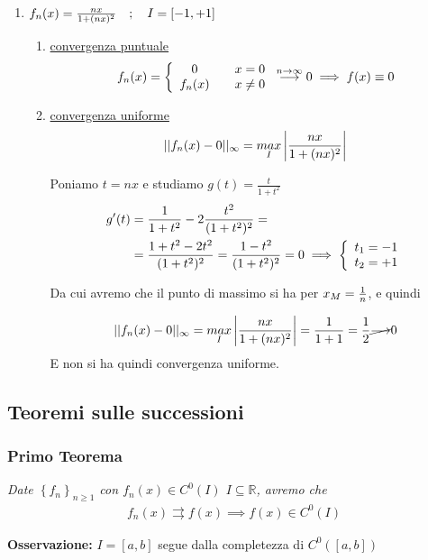 \begin{enumerate}
	\item $f_n(x)=\frac{nx}{1+ (nx)^2} \quad ; \quad I=[-1,+1]$
	\begin{enumerate}
		\item \underline{convergenza puntuale}
		\begin{align}
		f_n(x) =  \left\{\begin{array}{cc} 0 \quad {}&x=0 \\ f_n(x) \quad &x\neq 0 \end{array}\right. \overset{n \rightarrow \infty}{\longrightarrow} 0 \implies f(x) \equiv 0
		\end{align}
		\item \underline{convergenza uniforme}
		\begin{align}
		||f_n(x) - 0||_\infty = \underset{I}{max} \left| \frac{nx}{1+ (nx)^2} \right|
		\end{align}
		
		Poniamo $t= nx$ e studiamo $g(t)= \frac{t}{1+ t^2}$
		\begin{align}
		g'(t){}&= \frac{1}{1 + t^2} - 2\frac{t^2}{(1+t^2)^2} = \nonumber \\
		&= \frac{1 + t^2 -2t^2}{(1+t^2)^2}=\frac{1 -t^2}{(1+t^2)^2}=0 \implies \left\{\begin{array}{cc} t_1 = -1 \\ t_2 = +1 \end{array}\right.
		\end{align}
		
		Da cui avremo che il punto di massimo si ha per $x_M = \frac{1}{n}$, e quindi
		
		\begin{align}
		||f_n(x) - 0||_\infty = \underset{I}{max} \left| \frac{nx}{1+ (nx)^2} \right|= \frac{1}{1+1}=\frac{1}{2} \cancel{\longrightarrow} 0
		\end{align}
		E non si ha quindi convergenza uniforme.	
	\end{enumerate}
	
\end{enumerate}

\subsection{Teoremi sulle successioni}

\subsubsection{Primo Teorema}

\textit{
Date $\left\{f_n \right\}_{n\geq 1}$ con $f_n(x)\in C^0(I)$ $I\subseteq \mathbb{R}$, avremo che}
\begin{align}
f_n(x) \rightrightarrows f(x) \implies f(x)\in C^0(I)
\end{align}

\textbf{Osservazione:} $I=[a,b]$ segue dalla completezza di $C^0([a,b])$ 

